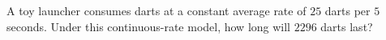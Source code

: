 A toy launcher consumes darts at a constant average rate of $25$ darts per $5$ seconds. Under this continuous-rate model, how long will $2296$ darts last?
